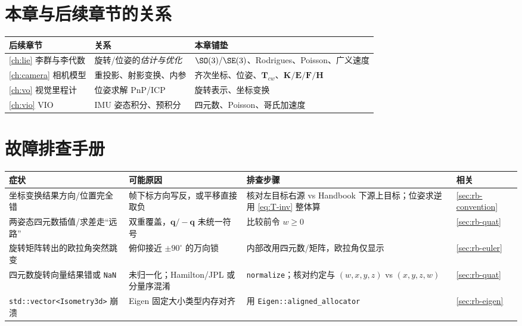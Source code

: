 \section*{本章与后续章节的关系}
\begin{table}[H]\centering\small
\begin{tabular}{lll}
\toprule
后续章节 & 关系 & 本章铺垫 \\
\midrule
\cref{ch:lie} 李群与李代数 & 旋转/位姿的\emph{估计与优化} & $\SO(3)/\SE(3)$、Rodrigues、Poisson、广义速度 \\
\cref{ch:camera} 相机模型 & 重投影、射影变换、内参 & 齐次坐标、位姿、$\mathbf{T}_{cw}$、$\mathbf{K}/\mathbf{E}/\mathbf{F}/\mathbf{H}$ \\
\cref{ch:vo} 视觉里程计 & 位姿求解 PnP/ICP & 旋转表示、坐标变换 \\
\cref{ch:vio} VIO & IMU 姿态积分、预积分 & 四元数、Poisson、哥氏加速度 \\
\bottomrule
\end{tabular}
\end{table}

\section*{故障排查手册}
\begin{table}[H]\centering\small
\begin{tabular}{p{} p{} p{} l}
\toprule
症状 & 可能原因 & 排查步骤 & 相关 \\
\midrule
坐标变换结果方向/位置完全错 & 帧下标方向写反，或平移直接取负 & 核对左目标右源 vs Handbook 下源上目标；位姿求逆用 \cref{eq:T-inv} 整体算 & \cref{sec:rb-convention} \\
两姿态四元数插值/求差走“远路” & 双重覆盖，$\mathbf{q}/-\mathbf{q}$ 未统一符号 & 比较前令 $w\ge0$ & \cref{sec:rb-quat} \\
旋转矩阵转出的欧拉角突然跳变 & 俯仰接近 $\pm90^\circ$ 的万向锁 & 内部改用四元数/矩阵，欧拉角仅显示 & \cref{sec:rb-euler} \\
四元数旋转向量结果错或 \texttt{NaN} & 未归一化；Hamilton/JPL 或分量序混淆 & \texttt{normalize}；核对约定与 $(w,x,y,z)$ vs $(x,y,z,w)$ & \cref{sec:rb-quat} \\
\texttt{std::vector<Isometry3d>} 崩溃 & Eigen 固定大小类型内存对齐 & 用 \texttt{Eigen::aligned\_allocator} & \cref{sec:rb-eigen} \\
\bottomrule
\end{tabular}
\end{table}

